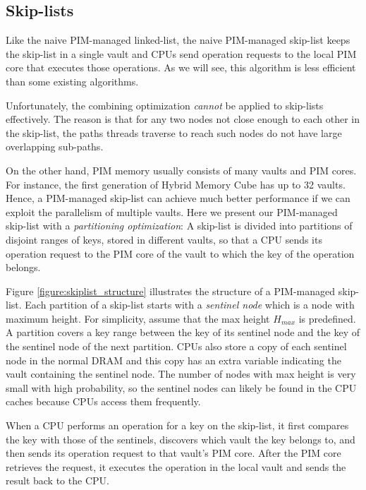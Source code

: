 \subsection{Skip-lists}
\label{section:skip_list}


Like the naive PIM-managed linked-list,
the naive PIM-managed skip-list keeps the skip-list in a single vault and
CPUs send operation requests to the local PIM core that executes those operations.
As we will see, this algorithm is less efficient than some existing algorithms.

Unfortunately, the combining optimization \emph{cannot} be applied to skip-lists effectively.
The reason is that for any two nodes not close enough to each other in the skip-list,
the paths threads traverse to reach such nodes do not have large overlapping sub-paths.

On the other hand, PIM memory usually consists of many vaults and PIM cores.
For instance, the first generation of Hybrid Memory Cube \cite{website:HMC} has up to 32 vaults.
Hence, a PIM-managed skip-list can achieve much better performance if
we can exploit the parallelism of multiple vaults.
Here we present our PIM-managed skip-list with a \textit{partitioning optimization}:
A skip-list is divided into partitions of disjoint ranges of keys,
stored in different vaults, so that a CPU sends its operation request to
the PIM core of the vault to which the key of the operation belongs.

Figure \ref{figure:skiplist_structure} illustrates the structure of a PIM-managed skip-list.
Each partition of a skip-list starts with a \textit{sentinel node}
which is a node with maximum height. 
For simplicity, assume that the max height $H_{max}$ is predefined.
A partition covers a key range between the key of its sentinel node and
the key of the sentinel node of the next partition.
CPUs also store a copy of each sentinel node in the normal DRAM and 
this copy has an extra variable indicating the vault containing the sentinel node.
The number of nodes with max height is very small with high probability, 
so the sentinel nodes can likely be found in the CPU caches  
because CPUs access them frequently.

When a CPU performs an operation for a key on the skip-list,
it first compares the key with those of the sentinels, discovers which vault
the key belongs to, and then sends its operation request to that vault's PIM core.
After the PIM core retrieves the request, it executes the operation in the local vault 
and sends the result back to the CPU.


